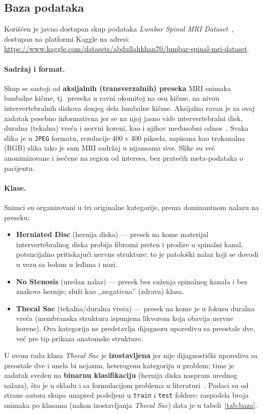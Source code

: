 \documentclass[12pt,a4paper]{article}
\begin{document}
\subsection{Baza podataka}
\label{sec:baza}

Korišćen je javno dostupan skup podataka \textit{Lumbar Spinal MRI
Dataset}~\cite{khan2023dataset}, dostupan na platformi Kaggle na adresi:\\
\url{https://www.kaggle.com/datasets/abdullahkhan70/lumbar-spinal-mri-dataset}.

\paragraph{Sadržaj i format.}
Skup se sastoji od \textbf{aksijalnih (transverzalnih) preseka} MRI snimaka lumbalne
kičme, tj.\ preseka u ravni okomitoj na osu kičme, na nivou intervertebralnih diskova
donjeg dela lumbalne kičme. Aksijalna ravan je za ovaj zadatak posebno informativna jer se
na njoj jasno vide intervertebralni disk, duralna (tekalna) vreća i nervni koreni, kao i
njihov međusobni odnos~\cite{hou2023mri}. Svaka slika je u \texttt{JPEG} formatu,
rezolucije $400\times400$ piksela, zapisana kao trokanalna (RGB) slika iako je sam MRI
sadržaj u nijansama sive. Slike su već anonimizovane i isečene na region od interesa, bez
pratećih meta-podataka o pacijentu.

\paragraph{Klase.}
Snimci su organizovani u tri originalne kategorije, prema dominantnom nalazu na preseku:
\begin{itemize}
  \item \textbf{Herniated Disc} (hernija diska) --- presek na kome materijal
        intervertebralnog diska probija fibrozni prsten i prodire u spinalni kanal,
        potencijalno pritiskajući nervne strukture; to je patološki nalaz koji se dovodi u
        vezu sa bolom u leđima i nozi.
  \item \textbf{No Stenosis} (uredan nalaz) --- presek bez suženja spinalnog kanala i bez
        znakova hernije; služi kao ,,negativna'' (zdrava) klasa.
  \item \textbf{Thecal Sac} (tekalna/duralna vreća) --- presek na kome je u fokusu duralna
        vreća (membranska struktura ispunjena likvorom koja obavija nervne korene). Ova
        kategorija ne predstavlja dijagnozu uporedivu sa preostale dve, već pre tip prikaza
        anatomske strukture.
\end{itemize}
U ovom radu klasa \textit{Thecal Sac} je \textbf{izostavljena} jer nije dijagnostički
uporediva sa preostale dve i unela bi nejasnu, heterogenu kategoriju u problem; time je
zadatak sveden na \textbf{binarnu klasifikaciju} (hernija diska naspram urednog nalaza),
što je u skladu i sa formulacijom problema u literaturi~\cite{hou2023mri}. Podaci su od
strane autora skupa unapred podeljeni u \texttt{train} i \texttt{test} foldere; raspodela
broja snimaka po klasama (nakon izostavljanja \textit{Thecal Sac}) data je u
tabeli~\ref{tab:baza}.
\end{document}
